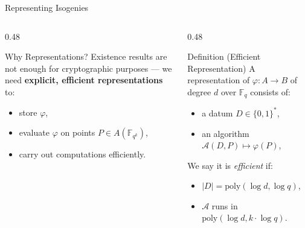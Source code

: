 \documentclass[aspectratio=169,notheorems]{beamer}
\begin{document}
	\begin{frame}{Representing Isogenies}
		\begin{columns}[T]
			\begin{column}{0.48\textwidth}
				\begin{block}{Why Representations?}
					Existence results are not enough for cryptographic
					purposes — we need \textbf{explicit, efficient representations}
					to:
					\begin{itemize}
						\item store $\varphi$,
						\item evaluate $\varphi$ on points $P \in A(\mathbb{F}_{q^k})$,
						\item carry out computations efficiently.
					\end{itemize}
				\end{block}
			\end{column}
			\begin{column}{0.48\textwidth}
				\begin{exampleblock}{Definition (Efficient Representation)\cite{lerouxanewisogenyrepresentation22}}
					A representation of $\varphi: A \to B$
					of degree $d$ over $\mathbb{F}_q$ consists of:
					\begin{itemize}
						\item a datum $D \in \{0,1\}^*$,
						\item an algorithm $\mathcal{A}(D, P) \mapsto \varphi(P)$,
					\end{itemize}
					We say it is \emph{efficient} if:
					\begin{itemize}
						\item $|D| = \mathrm{poly}(\log d, \log q)$,
						\item $\mathcal{A}$ runs in $\mathrm{poly}(\log d, k \cdot \log q)$.
					\end{itemize} 
				\end{exampleblock}
			\end{column}
		\end{columns}
		\vspace{0.5em}
\end{frame}
\end{document}
